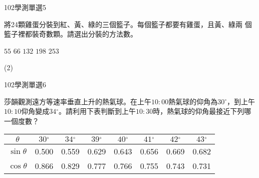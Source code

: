 \begin{QUESTIONS}
\begin{QUESTION}
\begin{ExamInfo}{102}{學測}{單選}{5}
        \end{ExamInfo}
        \begin{ExamAnsRateInfo}{50}{75}{50}{25}
        \end{ExamAnsRateInfo}
        \begin{QBODY}
			將24顆雞蛋分裝到紅、黃、綠的三個籃子。每個籃子都要有雞蛋，且黃、綠兩
			個籃子裡都裝奇數顆。請選出分裝的方法數。
			\begin{QOPS}
					\QOP $55  $
					\QOP $66  $
					\QOP $132 $
					\QOP $198 $
					\QOP $253 $
			\end{QOPS}
        \end{QBODY}
        \begin{QFROMS}
        \end{QFROMS}
        \begin{QTAGS}\end{QTAGS}
        \begin{QANS}
            (2)
        \end{QANS}
        \begin{QSOLLIST}
        \end{QSOLLIST}
        \begin{QEMPTYSPACE}
        \end{QEMPTYSPACE}
    \end{QUESTION}
    \begin{QUESTION}
        \begin{ExamInfo}{102}{學測}{單選}{6}
        \end{ExamInfo}
        \begin{ExamAnsRateInfo}{39}{71}{31}{15}
        \end{ExamAnsRateInfo}
        \begin{QBODY}
			莎韻觀測遠方等速率垂直上升的熱氣球。在上午$10:00$熱氣球的仰角為$30{}^\circ $，到上午$10:10$仰角變成$34{}^\circ $。請利用下表判斷到上午$10:30$時，熱氣球的仰角最接近下列哪一個度數？
			\begin{tabular}{|c|c|c|c|c|c|c|c|}
			\hline
			$\theta $		& $30{}^\circ $ & $34{}^\circ $ & 	$39{}^\circ $	&  $40{}^\circ $   & $41{}^\circ $ & $42{}^\circ $	& $43{}^\circ $  \\\hline
			$\sin \theta $	& 0.500	        &    0.559	    &       0.629	    &     0.643	       &   0.656	   &       0.669	&      0.682     \\\hline
			$\cos \theta $	& 0.866	        &    0.829	    &       0.777	    &     0.766	       &   0.755	   &       0.743	&      0.731     \\\hline

\end{tabular}
\end{QBODY}
\end{QUESTION}
\end{QUESTIONS}
